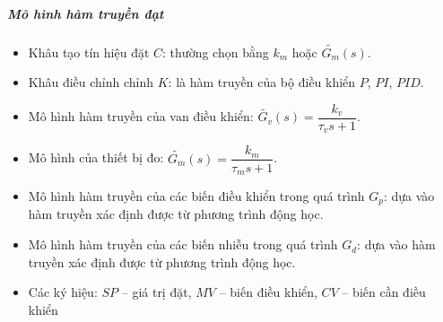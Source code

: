     \subparagraph{Mô hình hàm truyền đạt}
        \begin{itemize}
            \item Khâu tạo tín hiệu đặt $C$: thường chọn bằng $k_m$ hoặc $\tilde{G_m}(s)$.
            \item Khâu điều chỉnh chỉnh $K$: là hàm truyền của bộ điều khiển $P$, $PI$, $PID$.
            \item Mô hình hàm truyền của van điều khiển: $\tilde{G_v}(s) = \dfrac{k_v}{\tau_v s + 1}$.
            \item Mô hình của thiết bị đo: $\tilde{G_m}(s) = \dfrac{k_m}{\tau_m s + 1}$.
            \item Mô hình hàm truyền của các biến điều khiển trong quá trình $G_p$: dựa vào hàm truyền xác định được từ phương trình động học.
            \item Mô hình hàm truyền của các biến nhiễu trong quá trình $G_d$: dựa vào hàm truyền xác định được từ phương trình động học.
            \item Các ký hiệu: $SP$ -- giá trị đặt, $MV$ -- biến điều khiển, $CV$ -- biến cần điều khiển
        \end{itemize}
